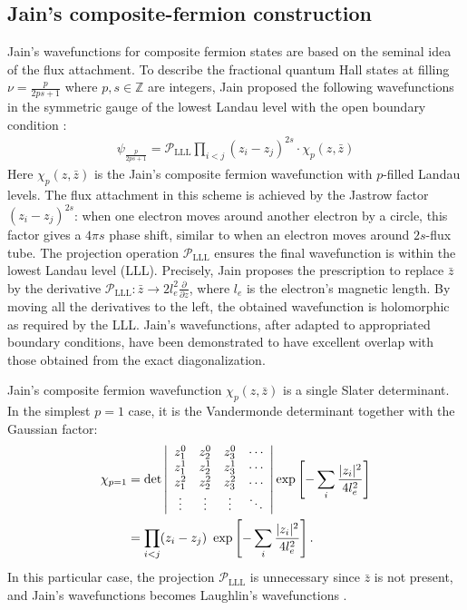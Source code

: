 \subsection{Jain's composite-fermion construction}
Jain's wavefunctions for composite fermion states \cite{jain1989composite,jain1989incompressible,jain1990theory,jain2007composite,balram2013state} are based on the seminal idea of the flux attachment. To describe the fractional quantum Hall states at filling $\nu=\frac{p}{2ps+1}$ where $p,s\in\mathbb Z$ are integers, Jain proposed the following wavefunctions in the symmetric gauge of the lowest Landau level with the open boundary condition \cite{kamilla1996composite}:
\begin{align}\label{eq1. Jain's wave function}
    \psi_{\frac{p}{2ps+1}}=\mathcal P_{\text{LLL}} \prod_{i<j} (z_i-z_j)^{2s}\cdot \chi_p(z,\bar z)
\end{align}
Here $\chi_p(z,\bar z)$ is the Jain's composite fermion wavefunction with $p$-filled Landau levels. The flux attachment in this scheme is achieved by the Jastrow factor $(z_i-z_j)^{2s}$: when one electron moves around another electron by a circle, this factor gives a $4\pi s$ phase shift, similar to when an electron moves around $2s$-flux tube. The projection operation $\mathcal P_{\text{LLL}}$ ensures the final wavefunction is within the lowest Landau level (LLL). Precisely, Jain proposes the prescription to replace $\bar z$ by the derivative $\mathcal P_{\text{LLL}}: \bar z\rightarrow 2 l_e^2 \frac{\partial}{\partial z}$, where $l_e$ is the electron's magnetic length. By moving all the derivatives to the left, the obtained wavefunction is holomorphic as required by the LLL. Jain's wavefunctions, after adapted to appropriated boundary conditions, have been demonstrated to have excellent overlap with those obtained from the exact diagonalization.

Jain's composite fermion wavefunction $\chi_p(z,\bar z)$ is a single Slater determinant. In the simplest $p=1$ case, it is the Vandermonde determinant together with the Gaussian factor:
\begin{align}
    \chi_{p=1} & =\det\left|\begin{array}{cccc}
                                z_1^0  & z_2^0  & z_3^0  & \cdots \\
                                z_1^1  & z_2^1  & z_3^1  & \cdots \\
                                z_1^2  & z_2^2  & z_3^2  & \cdots \\
                                \vdots & \vdots & \vdots & \ddots
                            \end{array}\right|\exp\left[-\sum_{i}\frac{|z_i|^2}{4l_e^2}\right]\notag                         \\
               & =\prod_{i<j}(z_i-z_j)~\exp\left[-\sum_{i}\frac{|z_i|^2}{4l_e^2}\right].\label{eq.2 Jain's CF wave function}
\end{align}
In this particular case, the projection $\mathcal P_{\text{LLL}}$ is unnecessary since $\bar z$ is not present, and Jain's wavefunctions becomes Laughlin's wavefunctions \cite{laughlin1983anomalous}.

